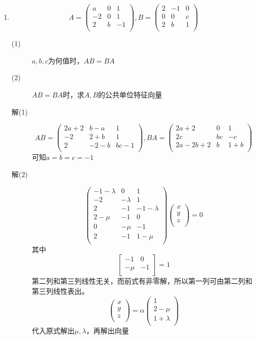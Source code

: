 \begin{enumerate}
\item
\[
A=\left(
\begin{array}{ccc}
a & 0 & 1 \\
-2 & 0 & 1 \\
2 & b & -1 \\
\end{array}
\right),
B=\left(
\begin{array}{ccc}
2 & -1 & 0 \\
0 & 0 & c \\
2 & b & 1 \\
\end{array}
\right)
\]
\begin{description}
\item[(1)] $a,b,c$为何值时，$AB=BA$
\item[(2)] $AB=BA$时，求$A,B$的公共单位特征向量
\item[解(1)]
\[
AB=\left(
\begin{array}{ccc}
2a+2 & b-a & 1 \\
-2 & 2+b & 1 \\
2 & -2-b & bc-1\\
\end{array}\right)
,
BA=\left(
\begin{array}{ccc}
2a+2 & 0 & 1 \\
2c & bc & -c \\
2a-2b+2 & b & 1+b\\
\end{array}\right)
\]
可知$a=b=c=-1$
\item[解(2)]
\[
\left(
\begin{array}{ccc}
-1-\lambda & 0 & 1 \\
-2 & -\lambda & 1 \\
2 & -1 & -1-\lambda\\
2-\mu & -1 & 0\\
0 & -\mu & -1\\
2 & -1 & 1-\mu\\
\end{array}\right)
\left(
\begin{array}{c}
x\\
y\\
z\\
\end{array}
\right)=0
\]
其中
\[
\left[
\begin{array}{cc}
-1 & 0 \\
-\mu & -1 \\
\end{array}
\right] = 1
\]
第二列和第三列线性无关，而前式有非零解，所以第一列可由第二列和第三列线性表出。
\[
\left(
\begin{array}{c}
x\\
y\\
z\\
\end{array}
\right) = \alpha
\left(
\begin{array}{c}
1\\
2-\mu\\
1+\lambda\\
\end{array}
\right)
\]
代入原式解出$\mu,\lambda$，再解出向量
\end{description}


\end{enumerate}
